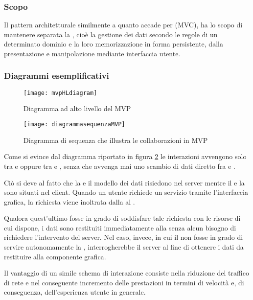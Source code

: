 \subsubsection{Scopo}
Il pattern architetturale  similmente a quanto accade per  (MVC), ha lo scopo di mantenere separata la , cioè la gestione dei dati secondo le regole di un determinato dominio e la loro memorizzazione in forma persistente, dalla presentazione e manipolazione mediante interfaccia utente.

\subsubsection{Diagrammi esemplificativi}
\begin{figure}[H]
\centering
\texttt{[image: mvpHLdiagram]}
\caption{Diagramma ad alto livello del  MVP}\label{fig:mvpHL}
\end{figure}

\begin{figure}[H]
\centering
\texttt{[image: diagrammasequenzaMVP]}
\caption{Diagramma di sequenza che illustra le collaborazioni in MVP}\label{fig:mvpSD}
\end{figure}

Come si evince dal diagramma riportato in figura \ref{fig:mvpSD} le interazioni avvengono solo tra  e  oppure tra  e , senza che avvenga mai uno scambio di dati diretto fra  e .

Ciò si deve al fatto che la  e il modello dei dati risiedono nel server mentre il  e la  sono situati nel client. Quando un utente richiede un servizio tramite l'interfaccia grafica, la richiesta viene inoltrata dalla  al .

Qualora quest'ultimo fosse in grado di soddisfare tale richiesta con le risorse di cui dispone, i dati sono restituiti immediatamente alla  senza alcun bisogno di richiedere l'intervento del server. Nel caso, invece, in cui il  non fosse in grado di servire autonomamente la , interrogherebbe il server al fine di ottenere i dati da restituire alla componente grafica.

Il vantaggio di un simile schema di interazione consiste nella riduzione del traffico di rete e nel conseguente incremento delle prestazioni in termini di velocità e, di conseguenza, dell'esperienza utente in generale.

